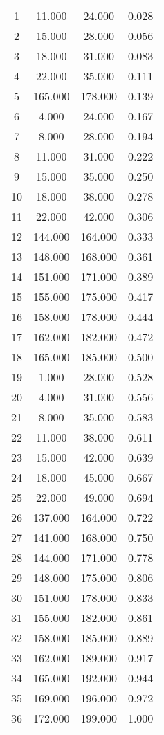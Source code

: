 % 
\begin{tabular}{cccc}
  \hline
  \hline
1 & 11.000 & 24.000 & 0.028 \\ 
  2 & 15.000 & 28.000 & 0.056 \\ 
  3 & 18.000 & 31.000 & 0.083 \\ 
  4 & 22.000 & 35.000 & 0.111 \\ 
  5 & 165.000 & 178.000 & 0.139 \\ 
  6 & 4.000 & 24.000 & 0.167 \\ 
  7 & 8.000 & 28.000 & 0.194 \\ 
  8 & 11.000 & 31.000 & 0.222 \\ 
  9 & 15.000 & 35.000 & 0.250 \\ 
  10 & 18.000 & 38.000 & 0.278 \\ 
  11 & 22.000 & 42.000 & 0.306 \\ 
  12 & 144.000 & 164.000 & 0.333 \\ 
  13 & 148.000 & 168.000 & 0.361 \\ 
  14 & 151.000 & 171.000 & 0.389 \\ 
  15 & 155.000 & 175.000 & 0.417 \\ 
  16 & 158.000 & 178.000 & 0.444 \\ 
  17 & 162.000 & 182.000 & 0.472 \\ 
  18 & 165.000 & 185.000 & 0.500 \\ 
  19 & 1.000 & 28.000 & 0.528 \\ 
  20 & 4.000 & 31.000 & 0.556 \\ 
  21 & 8.000 & 35.000 & 0.583 \\ 
  22 & 11.000 & 38.000 & 0.611 \\ 
  23 & 15.000 & 42.000 & 0.639 \\ 
  24 & 18.000 & 45.000 & 0.667 \\ 
  25 & 22.000 & 49.000 & 0.694 \\ 
  26 & 137.000 & 164.000 & 0.722 \\ 
  27 & 141.000 & 168.000 & 0.750 \\ 
  28 & 144.000 & 171.000 & 0.778 \\ 
  29 & 148.000 & 175.000 & 0.806 \\ 
  30 & 151.000 & 178.000 & 0.833 \\ 
  31 & 155.000 & 182.000 & 0.861 \\ 
  32 & 158.000 & 185.000 & 0.889 \\ 
  33 & 162.000 & 189.000 & 0.917 \\ 
  34 & 165.000 & 192.000 & 0.944 \\ 
  35 & 169.000 & 196.000 & 0.972 \\ 
  36 & 172.000 & 199.000 & 1.000 \\ 
   \hline
\end{tabular}
